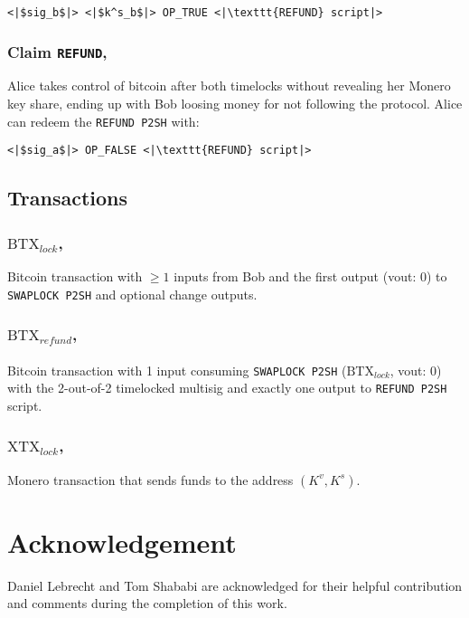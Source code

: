 \documentclass{llncs}
\begin{document}
\begin{verbatim}
<|$sig_b$|> <|$k^s_b$|> OP_TRUE <|\texttt{REFUND} script|>
\end{verbatim}

\subsubsection{Claim \texttt{REFUND},}
Alice takes control of bitcoin after both timelocks without revealing her Monero key share, ending up with Bob loosing money for not following the protocol. Alice can redeem the \texttt{REFUND P2SH} with:

\begin{verbatim}
<|$sig_a$|> OP_FALSE <|\texttt{REFUND} script|>
\end{verbatim}

\subsection{Transactions}
\subsubsection{$\text{BTX}_\textit{lock}$,}
Bitcoin transaction with $\geq 1$ inputs from Bob and the first output (vout: 0) to \texttt{SWAPLOCK P2SH} and optional change outputs.

\subsubsection{$\text{BTX}_\textit{refund}$,}
Bitcoin transaction with 1 input consuming \texttt{SWAPLOCK P2SH} ($\text{BTX}_\textit{lock}$, vout: 0) with the 2-out-of-2 timelocked multisig and exactly one output to \texttt{REFUND P2SH} script.

\subsubsection{$\text{XTX}_\textit{lock}$,}
Monero transaction that sends funds to the address $(K^v,K^s)$.

\section{Acknowledgement} Daniel Lebrecht and Tom Shababi are acknowledged for their helpful contribution and comments during the completion of this work.

%
%
\printbibliography
\end{document}
